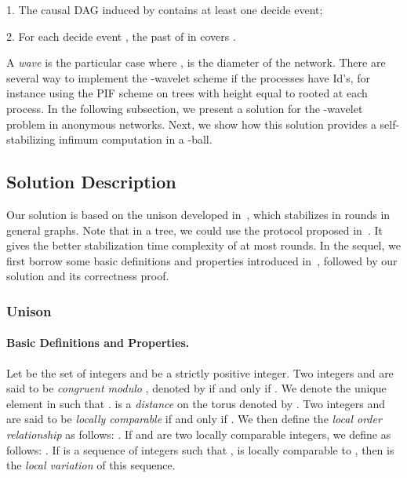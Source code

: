 \documentclass[11pt]{article}
\newcommand{\BEGLIST}{\begin{list}{}{\partopsep -2pt \parsep -2pt \listparindent 0pt}}\newcommand{\ENDLIST}{\end{list}}
\begin{document}
\BEGLIST
\item [1.] The causal DAG induced by  contains at least one decide event;

\item [2.] For each decide event , the past of  in 
 covers .
\ENDLIST


A \emph{wave} is the particular case where ,  is the diameter of the network.
There are several way to implement the -wavelet scheme if the processes have Id's, for instance using
the PIF scheme on trees with height equal to  rooted at each process.  In the following subsection,
we present a solution for the -wavelet problem in anonymous networks.  Next, we show how this solution 
provides a self-stabilizing infimum computation in a -ball.






\subsection{Solution Description}

Our solution is based on the unison developed in~\cite{BPV04b}, which  stabilizes in 
 rounds in general graphs. 
Note that in a tree, we could use the protocol proposed in~\cite{BPV06}.  It gives the better 
stabilization time complexity of at most  rounds.
In the sequel, we first borrow some basic definitions and properties introduced in~\cite{BPV04b},
followed by our solution and its correctness proof. 

\subsubsection{Unison}
\label{sub:unison}



\paragraph{Basic Definitions and Properties.}

Let  be the set of integers and  be a strictly positive integer.
Two integers  and  are said to be \emph{congruent modulo} , denoted by
 if and only if . We denote  the unique element in 
such that .   is a \emph{distance} 
on the torus  denoted by   . 
Two integers  and  are said to be \emph{locally comparable}  if and only if
 .  We then define
the \emph{local order relationship}  as follows: 
.
If  and  are two locally comparable integers,  we define  
 as follows:
.
If  is a sequence of integers such that 
,  is locally comparable to ,
then  is the \emph{local variation} of this sequence. 
\end{document}
